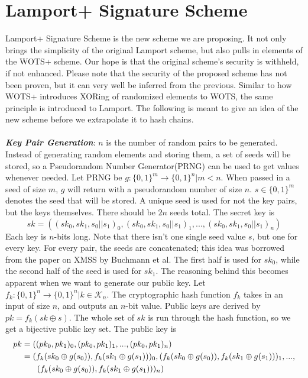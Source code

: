 \documentclass[]{scrartcl}
\makeatletter
\newcommand{\mathcenter}{\@fleqnfalse}
\makeatother
\begin{document}
\section*{Lamport+ Signature Scheme}
Lamport+ Signature Scheme is the new scheme we are proposing. It not only brings the simplicity of the original Lamport scheme, but also pulls in elements of the WOTS+ scheme. Our hope is that the original scheme's security is withheld, if not enhanced. Please note that the security of the proposed scheme has not been proven, but it can very well be inferred from the previous. Similar to how WOTS+ introduces XORing of randomized elements to WOTS, the same principle is introduced to Lamport. The following is meant to give an idea of the new scheme before we extrapolate it to hash chains.\\ \\
\textbf{\textit{Key Pair Generation}}: $n$ is the number of random pairs to be generated. Instead of generating random elements and storing them, a set of seeds will be stored, so a Pseudorandom Number Generator(PRNG) can be used to get values whenever needed. Let PRNG be $g : \{0,1\}^m \rightarrow \{0,1\}^n | m < n$. When passed in a seed of size $m$, $g$ will return with a pseudorandom number of size $n$. $s \in \{0,1\}^m$ denotes the seed that will be stored. A unique seed is used for not the key pairs, but the keys themselves. There should be $2n$ seeds total. The secret key is 
\mathcenter
\begin{equation}
sk = ((sk_0, sk_1, s_0||s_1)_0,(sk_0, sk_1, s_0||s_1)_1,...,(sk_0, sk_1, s_0||s_1)_n) 
\end{equation}
Each key is $n$-bits long. Note that there isn't one single seed value $s$, but one for every key. For every pair, the seeds are concatenated; this idea was borrowed from the paper on XMSS by Buchmann et al. The first half is used for $sk_0$, while the second half of the seed is used for $sk_1$. The reasoning behind this becomes apparent when we want to generate our public key. Let $f_k : \{0,1\}^n \rightarrow \{0,1\}^n | k \in \mathcal{K}_n$. The cryptographic hash function $f_k$ takes in an input of size $n$, and outputs an $n$-bit value. Public keys are derived by $pk = f_k(sk \oplus s)$. The whole set of $sk$ is run through the hash function, so we get a bijective public key set. The public key is
\mathcenter
\begin{equation}
	\begin{split}
		pk & = ((pk_0, pk_1)_0,(pk_0, pk_1)_1,...,(pk_0, pk_1)_n) \\
		& = (f_k(sk_0 \oplus g(s_0)), f_k(sk_1 \oplus g(s_1)))_0,(f_k(sk_0 \oplus g(s_0)), f_k(sk_1 \oplus g(s_1)))_1,...,\\
		& \hspace{0.65cm}(f_k(sk_0 \oplus g(s_0)), f_k(sk_1 \oplus g(s_1)))_n) 
	\end{split}
\end{equation}
\end{document}
